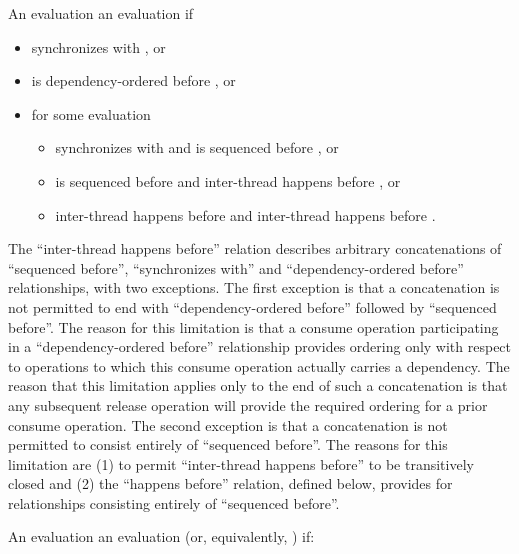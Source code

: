 \pnum
An evaluation   an evaluation 
if

\begin{itemize}

\item
{} synchronizes with , or

\item
{} is dependency-ordered before , or

\item
for some evaluation 

\begin{itemize}
\item
{} synchronizes with  and  is sequenced before ,
or

\item
{} is sequenced before  and  inter-thread happens before
, or

\item
{} inter-thread happens before  and  inter-thread happens
before .
\end{itemize}
\end{itemize}

\begin{note} The ``inter-thread happens before'' relation describes arbitrary
concatenations of ``sequenced before'', ``synchronizes with'' and
``dependency-ordered before'' relationships, with two exceptions. The first
exception is that a concatenation is not permitted to end with
``dependency-ordered before'' followed by ``sequenced before''. The reason for
this limitation is that a consume operation participating in a
``dependency-ordered before'' relationship provides ordering only with respect
to operations to which this consume operation actually carries a dependency. The
reason that this limitation applies only to the end of such a concatenation is
that any subsequent release operation will provide the required ordering for a
prior consume operation. The second exception is that a concatenation is not
permitted to consist entirely of ``sequenced before''. The reasons for this
limitation are (1) to permit ``inter-thread happens before'' to be transitively
closed and (2) the ``happens before'' relation, defined below, provides for
relationships consisting entirely of ``sequenced before''. \end{note}

\pnum
An evaluation   an evaluation 
(or, equivalently,   ) if:

